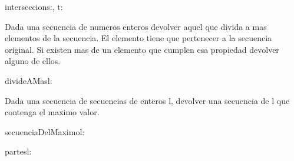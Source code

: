 \documentclass[10pt,a4paper]{article}
\begin{document}
\begin{proc}{interseccion}{\In s:, \In t:}{}
    \requiere{\True}
\end{proc}
Dada una secuencia de numeros enteros devolver aquel que divida a mas elementos de la secuencia. El elemento tiene que pertenecer a la secuencia original. Si existen mas de un elemento que cumplen esa propiedad devolver alguno de ellos.
\begin{proc}{divideAMas}{\In l: \TLista{\ent}}{\TLista{\ent}}
\end{proc}
Dada una secuencia de secuencias de enteros l, devolver una secuencia de l que contenga el maximo valor.
\begin{proc}{secuenciaDelMaximo}{\In l: \TLista{\TLista{\ent}}}{\TLista{\ent}}
    \requiere{\True}
\end{proc}
\begin{proc}{partes}{\In l: }{}
\end{proc}
\end{document}
